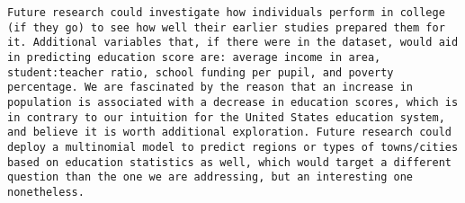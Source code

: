 \documentclass[
  letterpaper,
  DIV=11,
  numbers=noendperiod]{scrartcl}
\begin{document}
\begin{verbatim}
Future research could investigate how individuals perform in college (if they go) to see how well their earlier studies prepared them for it. Additional variables that, if there were in the dataset, would aid in predicting education score are: average income in area, student:teacher ratio, school funding per pupil, and poverty percentage. We are fascinated by the reason that an increase in population is associated with a decrease in education scores, which is in contrary to our intuition for the United States education system, and believe it is worth additional exploration. Future research could deploy a multinomial model to predict regions or types of towns/cities based on education statistics as well, which would target a different question than the one we are addressing, but an interesting one nonetheless. 
\end{verbatim}
\end{document}
